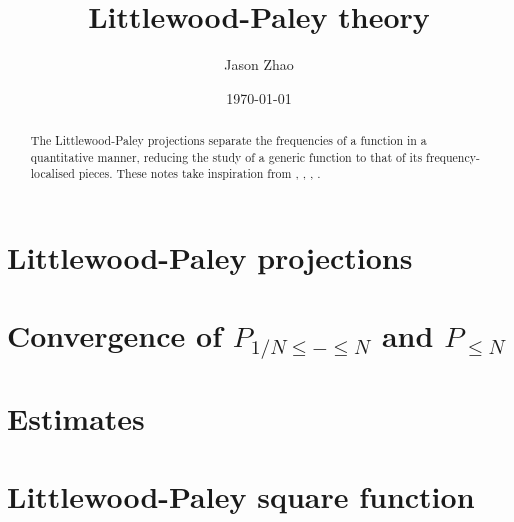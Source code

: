 \documentclass[reqno]{amsart}
\title
{
	{Littlewood-Paley theory}
}
\author{Jason Zhao}
\date{\today}
\begin{document}
\maketitle

\begin{abstract}
	The Littlewood-Paley projections separate the frequencies of a function in a quantitative manner, reducing the study of a generic function to that of its frequency-localised pieces. These notes take inspiration from \cite{Tao2006}, \cite{BahouriEtAl2011}, \cite{Stein16}, \cite{Grafakos2014a}. 
\end{abstract}

\tableofcontents

\section{Littlewood-Paley projections}


\section{Convergence of $P_{1/N \leq - \leq N}$ and $P_{\leq N}$}


\section{Estimates}


\section{Littlewood-Paley square function}




\end{document}
